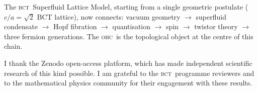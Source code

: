 \documentclass[aps,prl,preprint,superscriptaddress,floatfix]{revtex4-2}
\newcommand{\BCT}{\textsc{bct}}
\newcommand{\OHC}{\textsc{ohc}}
\begin{document}
The \BCT\ Superfluid Lattice Model, starting from a single geometric
postulate ($c/a=\sqrt{2}$ BCT lattice), now connects:
vacuum geometry $\to$ superfluid condensate $\to$ Hopf fibration $\to$
quantisation $\to$ spin $\to$ twistor theory $\to$ three fermion
generations.
The \OHC\ is the topological object at the centre of this chain.

\begin{acknowledgments}
I thank the Zenodo open-access platform, which has made independent
scientific research of this kind possible.
I am grateful to the \BCT\ programme reviewers and to the
mathematical physics community for their engagement with these results.
\end{acknowledgments}

\end{document}

